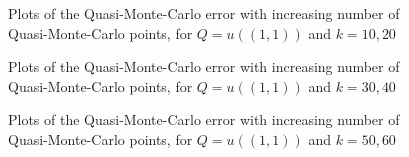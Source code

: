 \begin{figure}[h]
    \centering
  \begin{subfigure}{0.8\textwidth}

  \end{subfigure}
    \begin{subfigure}{0.8\textwidth}

    \end{subfigure}
\caption{Plots of the Quasi-Monte-Carlo error with increasing number of Quasi-Monte-Carlo points, for $Q=u((1,1))$ and $k=10,20$ \label{fig:qmctop_right1020}}
\end{figure}
\begin{figure}[h]
    \centering
  \begin{subfigure}{0.8\textwidth}

  \end{subfigure}
    \begin{subfigure}{0.8\textwidth}

    \end{subfigure}
\caption{Plots of the Quasi-Monte-Carlo error with increasing number of Quasi-Monte-Carlo points, for $Q=u((1,1))$ and $k=30,40$ \label{fig:qmctop_right3040}}
\end{figure}
\begin{figure}[h]
    \centering
  \begin{subfigure}{0.8\textwidth}

  \end{subfigure}
    \begin{subfigure}{0.8\textwidth}

    \end{subfigure}
\caption{Plots of the Quasi-Monte-Carlo error with increasing number of Quasi-Monte-Carlo points, for $Q=u((1,1))$ and $k=50,60$ \label{fig:qmctop_right5060}}
\end{figure}


